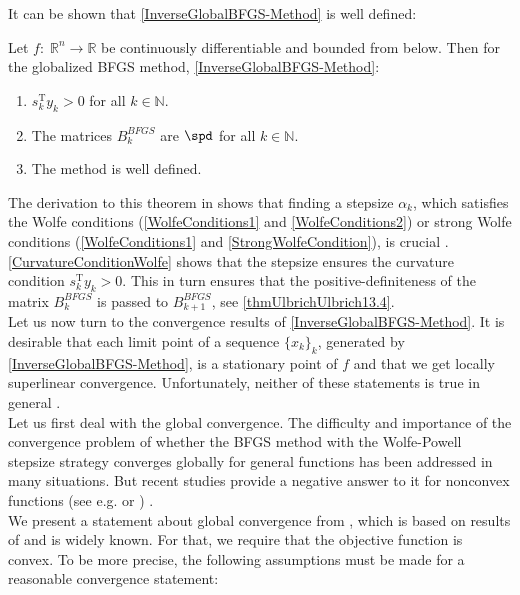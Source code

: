 It can be shown that \cref{InverseGlobalBFGS-Method} is well defined: 

\begin{theorem}
    Let $f \colon \; \mathbb{R}^n \to \mathbb{R}$ be continuously differentiable and bounded from below. Then for the globalized BFGS method, \cref{InverseGlobalBFGS-Method}:
    \begin{enumerate}
        \item $s^{\mathrm{T}}_k y_k > 0$ for all $k \in \mathbb{N}$.
        \item The matrices $B^{BFGS}_k$ are $\spd$ for all $k \in \mathbb{N}$.
        \item The method is well defined. 
    \end{enumerate}
\end{theorem}

The derivation to this theorem in \cite{GeigerKanzow:1999} shows that finding a stepsize $\alpha_k$, which satisfies the Wolfe conditions (\cref{WolfeConditions1} and \cref{WolfeConditions2}) or strong Wolfe conditions (\cref{WolfeConditions1} and \cref{StrongWolfeCondition}), is crucial \cite[p.~166]{GeigerKanzow:1999}. \cref{CurvatureConditionWolfe} shows that the stepsize ensures the curvature condition $s^{\mathrm{T}}_k y_k > 0$. This in turn ensures that the positive-definiteness of the matrix $B^{BFGS}_k$ is passed to $B^{BFGS}_{k+1}$, see \cref{thmUlbrichUlbrich13.4}. \\
Let us now turn to the convergence results of \cref{InverseGlobalBFGS-Method}. It is desirable that each limit point of a sequence $\{x_k\}_k$, generated by \cref{InverseGlobalBFGS-Method}, is a stationary point of $f$ and that we get locally superlinear convergence. Unfortunately, neither of these statements is true in general \cite[p.~167]{GeigerKanzow:1999}. \\
Let us first deal with the global convergence. The difficulty and importance of the convergence problem of whether the BFGS method with the Wolfe-Powell stepsize strategy converges globally for general functions has been addressed in many situations. But recent studies provide a negative answer to it for nonconvex functions (see e.g. \cite{Dai:2002} or \cite{Mascarenhas:2004}) \cite[p.~3]{Dai:2012}. \\
We present a statement about global convergence from \cite{NocedalWright:2006}, which is based on results of \cite{Powell:1975} and is widely known. For that, we require that the objective function is convex. To be more precise, the following assumptions must be made for a reasonable convergence statement:

